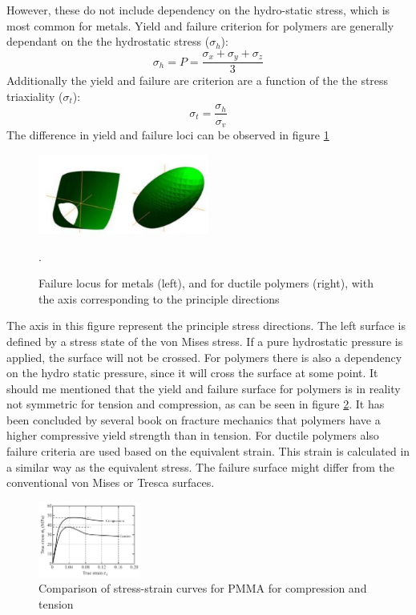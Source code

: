 However, these do not include dependency on the hydro-static stress, which is most common for metals. Yield and failure criterion for polymers are generally dependant on the the hydrostatic stress ($\sigma_h$):
\begin{equation} \label{eqn:Me}
  \sigma_h=P=\frac{\sigma_x+\sigma_y+\sigma_z}{3}
\end{equation}
Additionally the yield and failure are criterion are a function of the the stress triaxiality ($\sigma_t$):
\begin{equation}\label{AzziTsai}
\sigma_t=\frac{\sigma_h}{\sigma_v}
\end{equation}
The difference in yield and failure loci can be observed in figure \ref{fig:yieldloci}
\begin{figure}[H]
    \centering
    \includegraphics[width=0.5\textwidth]{chapter_2/figures/yieldloci.png}
    \caption{Failure locus for metals (left), and for ductile polymers (right), with the axis corresponding to the principle directions \cite{Christensen2013TheFailure}}.
    \label{fig:yieldloci}
\end{figure}
The axis in this figure represent the principle stress directions. The left surface is defined by a stress state of the von Mises stress. If a pure hydrostatic pressure is applied, the surface will not be crossed. For polymers there is also a dependency on the hydro static pressure, since it  will cross the surface at some point.  
It should me mentioned that the yield and failure surface for polymers is in reality not symmetric for tension and compression, as can be seen in figure \ref{fig:SStensioncompression}. It has been concluded by several book on fracture mechanics \cite{Janssen2014Co-magmeasurewD.pdf} that polymers have a higher compressive yield strength than in tension. 
For ductile polymers also failure criteria are used based on the equivalent strain. This strain is calculated in a similar way as the equivalent stress. The failure surface might differ from the conventional von Mises or Tresca surfaces. 
\begin{figure}[H]
    \centering
    \includegraphics[width=0.3\textwidth]{chapter_2/figures/SStensioncompression.png}
    \caption{Comparison of stress-strain curves for PMMA for compression and tension \cite{Halary2011PolymerMaterials}}
    \label{fig:SStensioncompression}
\end{figure}

